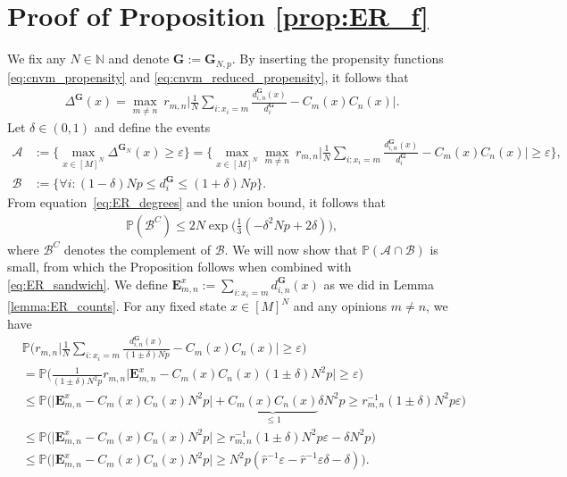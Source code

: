 \documentclass[a4paper,
               10pt,
               pdftex,
               normalheadings,
               headsepline,
               footsepline,
               headinclude,
               footinclude,
               DIV=14,
               abstracton]
{scrartcl}
\newcommand{\rv}[1]{\bm{#1}}
\begin{document}
\section{Proof of Proposition \ref{prop:ER_f}} \label{sec:appendix_proof_ER_f}
    We fix any $N \in \mathbb{N}$ and denote $\rv{G} := \rv{G}_{N,p}$.
    By inserting the propensity functions \eqref{eq:cnvm_propensity} and \eqref{eq:cnvm_reduced_propensity}, it follows that
    \begin{align}
        \Delta^{\rv{G}}(x) = \max_{m\neq n}\  r_{m,n} \Big\lvert \frac{1}{N} \sum_{i : x_{i} = m} \frac{d^{\rv{G}}_{i,n}(x)}{d^{\rv{G}}_i} - C_m(x) C_n(x) \Big\rvert.
    \end{align}
    Let $\delta \in (0,1)$ and define the events
    \begin{align}
        \mathcal{A} &:= \Big\{ \max_{x\in [M]^{N}} \Delta^{\rv{G}_N}(x) \geq \varepsilon \Big\} = \Big\{ \max_{x\in [M]^{N}} \max_{m \neq n}\ r_{m,n} \Big\lvert \frac{1}{N} \sum_{i : x_{i} = m} \frac{d^{\rv{G}}_{i,n}(x)}{d^{\rv{G}}_i} - C_m(x) C_n(x) \Big\rvert \geq \varepsilon \Big\},\\
        \mathcal{B} &:= \Big\{ \forall i: (1-\delta)Np \leq d^{\rv{G}}_i \leq (1+\delta)Np\Big\}.
    \end{align}
    From equation~\eqref{eq:ER_degrees} and the union bound, it follows that
    \begin{align} \label{eq:ER_sandwich}
        \mathbb{P}(\mathcal{B}^C) \leq 2 N \exp\Big(\frac{1}{3} (-\delta^2 N p + 2 \delta)\Big),
    \end{align}
    where $\mathcal{B}^C$ denotes the complement of $\mathcal{B}$. We will now show that $\mathbb{P}(\mathcal{A} \cap \mathcal{B})$ is small, from which the Proposition follows when combined with \eqref{eq:ER_sandwich}.
    We define $\rv{E}^x_{m,n} := \sum_{i:x_i=m} d_{i,n}^{\rv{G}}(x)$ as we did in Lemma \ref{lemma:ER_counts}. For any fixed state $x \in [M]^N$ and any opinions $m \neq n$, we have
    \begin{align}
        &\mathbb{P}\Big( r_{m,n} \Big\lvert \frac{1}{N} \sum_{i : x_{i} = m} \frac{d^{\rv{G}}_{i,n}(x)}{(1\pm \delta)Np} - C_m(x) C_n(x) \Big\rvert \geq \varepsilon \Big)\\
        &= \mathbb{P}\Big( \frac{1}{(1\pm \delta) N^2 p} r_{m,n} \big\lvert \rv{E}^x_{m,n} - C_m(x) C_n(x) (1\pm \delta) N^2 p \big\rvert \geq \varepsilon \Big)\\
        & \leq \mathbb{P}\Big( \big\lvert \rv{E}^x_{m,n} - C_m(x) C_n(x) N^2 p \big\rvert + \underbrace{C_m(x) C_n(x)}_{\leq 1} \delta N^2 p \geq r_{m,n}^{-1}  (1\pm \delta) N^2 p \varepsilon \Big)\\
        & \leq \mathbb{P}\Big(\big\lvert \rv{E}^x_{m,n} - C_m(x) C_n(x) N^2 p \big\rvert \geq r_{m,n}^{-1} (1\pm \delta) N^2 p \varepsilon - \delta N^2 p  \Big) \\
        & \leq \mathbb{P}\Big( \big\lvert \rv{E}^x_{m,n} - C_m(x) C_n(x) N^2 p \big\rvert \geq N^2 p (\hat{r}^{-1} \varepsilon - \hat{r}^{-1} \varepsilon \delta - \delta) \Big).
    \end{align}
\end{document}
